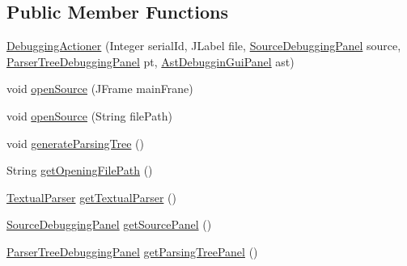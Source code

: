 \subsection*{Public Member Functions}
\begin{DoxyCompactItemize}
\item 
\hyperlink{classit_1_1emarolab_1_1cagg_1_1debugging_1_1DebuggingGui_1_1DebuggingActioner_a85118d44ffbe9efe58fdf981545827e7}{Debugging\-Actioner} (Integer serial\-Id, J\-Label file, \hyperlink{classit_1_1emarolab_1_1cagg_1_1debugging_1_1baseComponents_1_1customPanel_1_1SourceDebuggingPanel}{Source\-Debugging\-Panel} source, \hyperlink{classit_1_1emarolab_1_1cagg_1_1debugging_1_1baseComponents_1_1customPanel_1_1ParserTreeDebuggingPanel}{Parser\-Tree\-Debugging\-Panel} pt, \hyperlink{classit_1_1emarolab_1_1cagg_1_1debugging_1_1baseComponents_1_1customPanel_1_1AstDebugginGuiPanel}{Ast\-Debuggin\-Gui\-Panel} ast)
\item 
void \hyperlink{classit_1_1emarolab_1_1cagg_1_1debugging_1_1DebuggingGui_1_1DebuggingActioner_a3b752904d7a7397e0ecedc43227a9b9e}{open\-Source} (J\-Frame main\-Frane)
\item 
void \hyperlink{classit_1_1emarolab_1_1cagg_1_1debugging_1_1DebuggingGui_1_1DebuggingActioner_ab559a5f04bf24d0c75f396c7220a3115}{open\-Source} (String file\-Path)
\item 
void \hyperlink{classit_1_1emarolab_1_1cagg_1_1debugging_1_1DebuggingGui_1_1DebuggingActioner_a0b7b5f281c976b143fdc1bf29cc2e6ae}{generate\-Parsing\-Tree} ()
\item 
String \hyperlink{classit_1_1emarolab_1_1cagg_1_1debugging_1_1DebuggingGui_1_1DebuggingActioner_adc382ecd5b1ae40f45efebcec8e66cd4}{get\-Opening\-File\-Path} ()
\item 
\hyperlink{classit_1_1emarolab_1_1cagg_1_1core_1_1language_1_1parser_1_1TextualParser}{Textual\-Parser} \hyperlink{classit_1_1emarolab_1_1cagg_1_1debugging_1_1DebuggingGui_1_1DebuggingActioner_a11a36987ab5b46424ba8aeeea02ffb83}{get\-Textual\-Parser} ()
\item 
\hyperlink{classit_1_1emarolab_1_1cagg_1_1debugging_1_1baseComponents_1_1customPanel_1_1SourceDebuggingPanel}{Source\-Debugging\-Panel} \hyperlink{classit_1_1emarolab_1_1cagg_1_1debugging_1_1DebuggingGui_1_1DebuggingActioner_a87fccd7b1e0254ca0c26444ca9a6ca56}{get\-Source\-Panel} ()
\item 
\hyperlink{classit_1_1emarolab_1_1cagg_1_1debugging_1_1baseComponents_1_1customPanel_1_1ParserTreeDebuggingPanel}{Parser\-Tree\-Debugging\-Panel} \hyperlink{classit_1_1emarolab_1_1cagg_1_1debugging_1_1DebuggingGui_1_1DebuggingActioner_aa1ebe0a970785a53038ffb06144a03a1}{get\-Parsing\-Tree\-Panel} ()

\end{DoxyCompactItemize}

